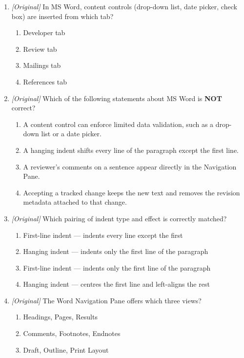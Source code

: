 \begin{enumerate}[label=\textbf{Q\arabic*.}, leftmargin=*]
\item \textit{[Original]} In MS Word, content controls (drop-down list, date
  picker, check box) are inserted from which tab?
  \begin{enumerate}[label=\Alph*.]
    \item Developer tab
    \item Review tab
    \item Mailings tab
    \item References tab
  \end{enumerate}
\item \textit{[Original]} Which of the following statements about MS Word is
  \textbf{NOT} correct?
  \begin{enumerate}[label=\Alph*.]
    \item A content control can enforce limited data validation, such as a
      drop-down list or a date picker.
    \item A hanging indent shifts every line of the paragraph except the first
      line.
    \item A reviewer's comments on a sentence appear directly in the Navigation
      Pane.
    \item Accepting a tracked change keeps the new text and removes the
      revision metadata attached to that change.
  \end{enumerate}
\item \textit{[Original]} Which pairing of indent type and effect is correctly
  matched?
  \begin{enumerate}[label=\Alph*.]
    \item First-line indent --- indents every line except the first
    \item Hanging indent --- indents only the first line of the paragraph
    \item First-line indent --- indents only the first line of the paragraph
    \item Hanging indent --- centres the first line and left-aligns the rest
  \end{enumerate}
\item \textit{[Original]} The Word Navigation Pane offers which three views?
  \begin{enumerate}[label=\Alph*.]
    \item Headings, Pages, Results
    \item Comments, Footnotes, Endnotes
    \item Draft, Outline, Print Layout

\end{enumerate}
\end{enumerate}
